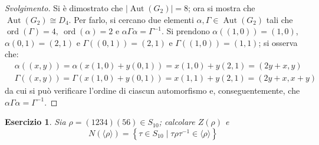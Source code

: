 \documentclass[12pt]{scrartcl}
\theoremstyle{style}
\newtheorem{esercizio}{Esercizio}[section]
\newenvironment{svolgimento}{\renewcommand\qedsymbol{$\blacksquare$}\begin{proof}[Svolgimento]}{\end{proof}}
\numberwithin{equation}{subsection}
\begin{document}
\begin{svolgimento}
	Si \`e dimostrato che $|\operatorname{Aut} (G_2)| = 8$; ora si mostra che $\operatorname{Aut} (G_2) \cong D_4$.
	Per farlo, si cercano due elementi $\alpha , \Gamma \in \operatorname{Aut} (G_2)$ tali che $\operatorname{ord}(\Gamma) = 4, \ \operatorname{ord}(\alpha ) = 2$ e $\alpha \Gamma \alpha = \Gamma^{-1}$.
	Si prendono $\alpha ((1,0))= (1,0)$, $\alpha (0,1) = (2,1)$ e $\Gamma((0,1)) = (2,1)$ e $\Gamma((1,0)) = (1,1)$; si osserva che:
	\[
	\begin{split}
		&\alpha ((x,y)) = \alpha (x(1,0)+y(0,1)) = x(1,0) + y (2,1) =(2y+x,y)\\
		& \Gamma((x,y)) = \Gamma (x(1,0) + y (0,1)) = x (1,1) + y(2,1) = (2y+x,x+y)
	\end{split}
	\] 
	da cui si pu\`o verificare l'ordine di ciascun automorfismo e, conseguentemente, che $\alpha \Gamma\alpha = \Gamma^{-1}$.
\end{svolgimento}
\begin{esercizio}
Sia $\rho = (1234)(56) \in S_{10}$; calcolare $Z(\rho )$ e 
\[
N(\langle \rho  \rangle)= \left\{ \tau \in S_{10}  \mid \tau \rho \tau ^{-1}\in \langle \rho  \rangle\right\} 
\] 
\end{esercizio}
\end{document}
